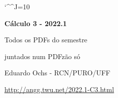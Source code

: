 \documentclass[oneside,12pt]{article}
\begin{document}

\def\u#1{\par{\footnotesize \url{#1}}}

\def\drafturl{http://angg.twu.net/LATEX/2022-1-C3.pdf}
\def\drafturl{http://angg.twu.net/2022.1-C3.html}
\def\draftfooter{\tiny \href{\drafturl}{\jobname{}} \ColorBrown{\shorttoday{} \hours}}

\catcode`\^^J=10
\pu



%

\thispagestyle{empty}

\begin{center}

\vspace*{1.2cm}

{\bf \Large Cálculo 3 - 2022.1}

\bsk

Todos os PDFs do semestre

juntados num PDFzão só

\bsk

Eduardo Ochs - RCN/PURO/UFF

\url{http://angg.twu.net/2022.1-C3.html}

\end{center}

\newpage




\end{document}

